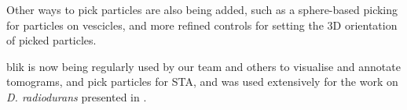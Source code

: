 Other ways to pick particles are also being added, such as a sphere-based picking for particles on vescicles, and more refined controls for setting the 3D orientation of picked particles.

blik is now being regularly used by our team and others to visualise and annotate tomograms, and pick particles for STA, and was used extensively for the work on \textit{D. radiodurans} presented in .
